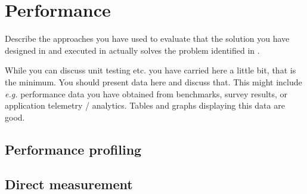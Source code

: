 \chapter{Performance}
\label{ch:performance} %

Describe the approaches you have used to evaluate that the solution you have designed in  and executed in  actually solves the problem identified in .

While you can discuss unit testing etc. you have carried here a little bit, that is the minimum. You should present data here and discuss that. This might include \emph{e.g.} performance data you have obtained from benchmarks, survey results, or application telemetry / analytics. Tables and graphs displaying this data are good.


\section{Performance profiling}
\label{sec:performance-profiling} %


\section{Direct measurement}
\label{sec:direct-measurement} %

